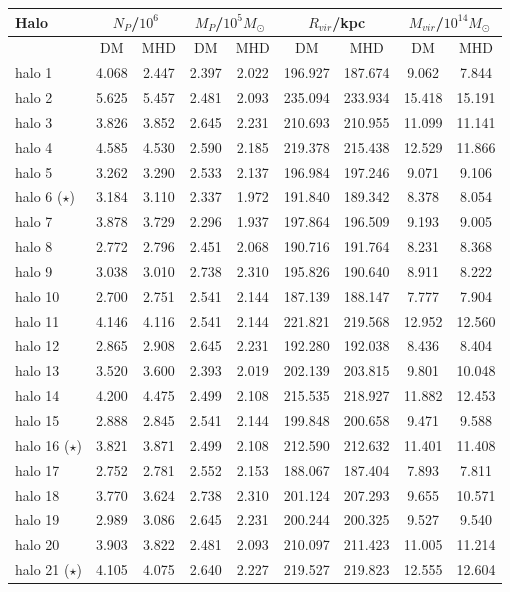 \documentclass[a4paper,fleqn,usenatbib]{mnras}
\begin{document}
\begin{table}
\centering
\begin{tabular}{l|cc|cc|cc|cc}
\hline
\hline
Halo & \multicolumn{2}{c}{$N_P$/$10^6$} & \multicolumn{2}{c}{$M_P$/$10^5M_\odot$} & 
\multicolumn{2}{c}{$R_{vir}$/kpc} & \multicolumn{2}{c}{$M_{vir}$/$10^{14} M_\odot$}  \\ \hline
& DM & MHD& DM & MHD& DM & MHD& DM & MHD\\ \hline \hline
halo 1&4.068&2.447&2.397&2.022&196.927&187.674&9.062&7.844\\
halo 2&5.625&5.457&2.481&2.093&235.094&233.934&15.418&15.191\\
halo 3&3.826&3.852&2.645&2.231&210.693&210.955&11.099&11.141\\
halo 4&4.585&4.530&2.590&2.185&219.378&215.438&12.529&11.866\\
halo 5&3.262&3.290&2.533&2.137&196.984&197.246&9.071&9.106\\ 
halo 6 ($\star$)&3.184&3.110&2.337&1.972&191.840&189.342&8.378&8.054\\ 
halo 7&3.878&3.729&2.296&1.937&197.864&196.509&9.193&9.005\\
halo 8&2.772&2.796&2.451&2.068&190.716&191.764&8.231&8.368\\
halo 9&3.038&3.010&2.738&2.310&195.826&190.640&8.911&8.222\\
halo 10&2.700&2.751&2.541&2.144&187.139&188.147&7.777&7.904\\
halo 11&4.146&4.116&2.541&2.144&221.821&219.568&12.952&12.560\\
halo 12&2.865&2.908&2.645&2.231&192.280&192.038&8.436&8.404\\
halo 13&3.520&3.600&2.393&2.019&202.139&203.815&9.801&10.048\\
halo 14&4.200&4.475&2.499&2.108&215.535&218.927&11.882&12.453\\
halo 15&2.888&2.845&2.541&2.144&199.848&200.658&9.471&9.588\\ 
halo 16 ($\star$)&3.821&3.871&2.499&2.108&212.590&212.632&11.401&11.408\\ 
halo 17&2.752&2.781&2.552&2.153&188.067&187.404&7.893&7.811\\
halo 18&3.770&3.624&2.738&2.310&201.124&207.293&9.655&10.571\\
halo 19&2.989&3.086&2.645&2.231&200.244&200.325&9.527&9.540\\
halo 20&3.903&3.822&2.481&2.093&210.097&211.423&11.005&11.214\\ 
halo 21 ($\star$) &4.105&4.075&2.640&2.227&219.527&219.823&12.555&12.604\\ 

\end{tabular}
\end{table}
\end{document}

